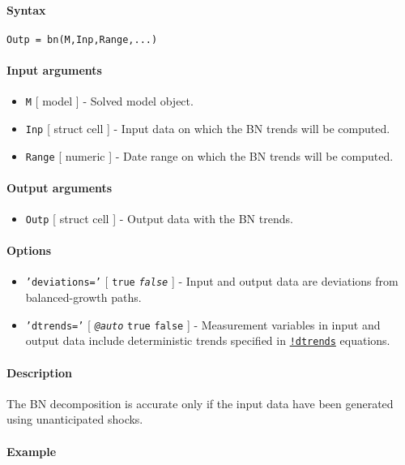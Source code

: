 


	\paragraph{Syntax}

\begin{verbatim}
Outp = bn(M,Inp,Range,...)
\end{verbatim}

\paragraph{Input arguments}

\begin{itemize}
\item
  \texttt{M} {[} model {]} - Solved model object.
\item
  \texttt{Inp} {[} struct \textbar{} cell {]} - Input data on which the
  BN trends will be computed.
\item
  \texttt{Range} {[} numeric {]} - Date range on which the BN trends
  will be computed.
\end{itemize}

\paragraph{Output arguments}

\begin{itemize}
\itemsep1pt\parskip0pt
\item
  \texttt{Outp} {[} struct \textbar{} cell {]} - Output data with the BN
  trends.
\end{itemize}

\paragraph{Options}

\begin{itemize}
\item
  \texttt{'deviations='} {[} \texttt{true} \textbar{}
  \emph{\texttt{false}} {]} - Input and output data are deviations from
  balanced-growth paths.
\item
  \texttt{'dtrends='} {[} \emph{\texttt{@auto}} \textbar{} \texttt{true}
  \textbar{} \texttt{false} {]} - Measurement variables in input and
  output data include deterministic trends specified in
  \href{modellang/dtrends}{\texttt{!dtrends}} equations.
\end{itemize}

\paragraph{Description}

The BN decomposition is accurate only if the input data have been
generated using unanticipated shocks.

\paragraph{Example}


